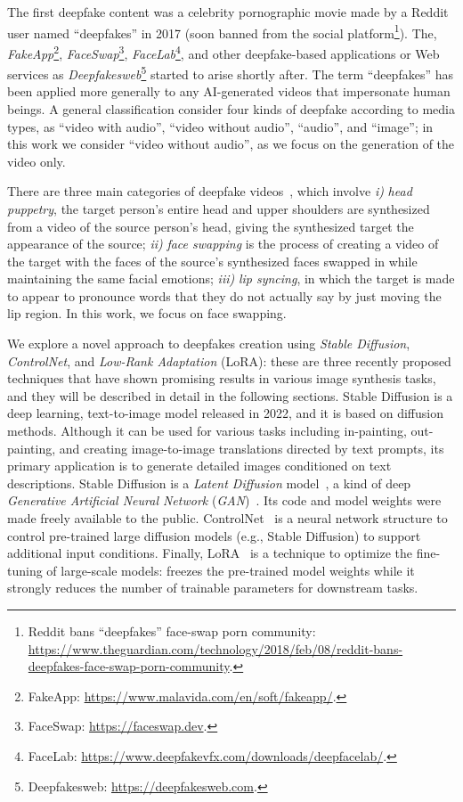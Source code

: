\documentclass[preprint]{elsarticle}
\begin{document}
The first deepfake content was a celebrity pornographic movie made by a Reddit user named ``deepfakes'' in 2017 (soon banned from the social platform\footnote{Reddit bans ``deepfakes'' face-swap porn community: \url{https://www.theguardian.com/technology/2018/feb/08/reddit-bans-deepfakes-face-swap-porn-community}.}). The, \emph{FakeApp}\footnote{FakeApp: \url{https://www.malavida.com/en/soft/fakeapp/}.}, \emph{FaceSwap}\footnote{FaceSwap: \url{https://faceswap.dev}.}, \emph{FaceLab}\footnote{FaceLab: \url{https://www.deepfakevfx.com/downloads/deepfacelab/}.}, and other deepfake-based applications or Web services as \emph{Deepfakesweb}\footnote{Deepfakesweb: \url{https://deepfakesweb.com}.} started to arise shortly after. 
The term ``deepfakes'' has been applied more generally to any AI-generated videos that impersonate human beings.
A general classification consider  four kinds of deepfake according to media types\cite{surveydet}, as ``video with audio'', ``video without audio'', ``audio'', and ``image''; in this work we consider ``video without audio'', as we focus on the generation of the video only.

There are three main categories of deepfake videos~\cite{lyu}, which involve \emph{i)} \emph{head puppetry}, the target person's entire head and upper shoulders are synthesized from a video of the source person's head, giving the synthesized target the appearance of the source; \emph{ii)} \emph{face swapping} is the process of creating a video of the target with the faces of the source's synthesized faces swapped in while maintaining the same facial emotions; \emph{iii)} \emph{lip syncing}, in which the target is made to appear to pronounce words that they do not actually say by just moving the lip region. In this work, we focus on face swapping.


We  explore a novel approach to deepfakes creation using  \emph{Stable Diffusion}, \emph{ControlNet}, and \emph{Low-Rank Adaptation} (LoRA):  these are three recently proposed techniques that  have shown promising results in various image synthesis tasks, and they will be described in detail in the following sections. Stable Diffusion is a deep learning, text-to-image model released in 2022,  and it is based on diffusion methods. Although it can be used for various tasks including in-painting, out-painting, and creating image-to-image translations directed by text prompts, its primary application is to generate detailed images conditioned on text descriptions. Stable Diffusion is a \emph{Latent Diffusion} model~\cite{rombach2022highresolution}, a kind of deep \emph{Generative Artificial Neural Network} (\emph{GAN})~\cite{GAN}. Its code and model weights were made freely available to the public.
ControlNet~\cite{zhang2023adding} is a neural network structure to control pre-trained large diffusion models (e.g., Stable Diffusion) to support additional input conditions. Finally, LoRA~\cite{hu2021lora} is a technique to optimize the fine-tuning of large-scale models: freezes the pre-trained model weights while it strongly reduces the number of trainable parameters for downstream tasks.
\end{document}
